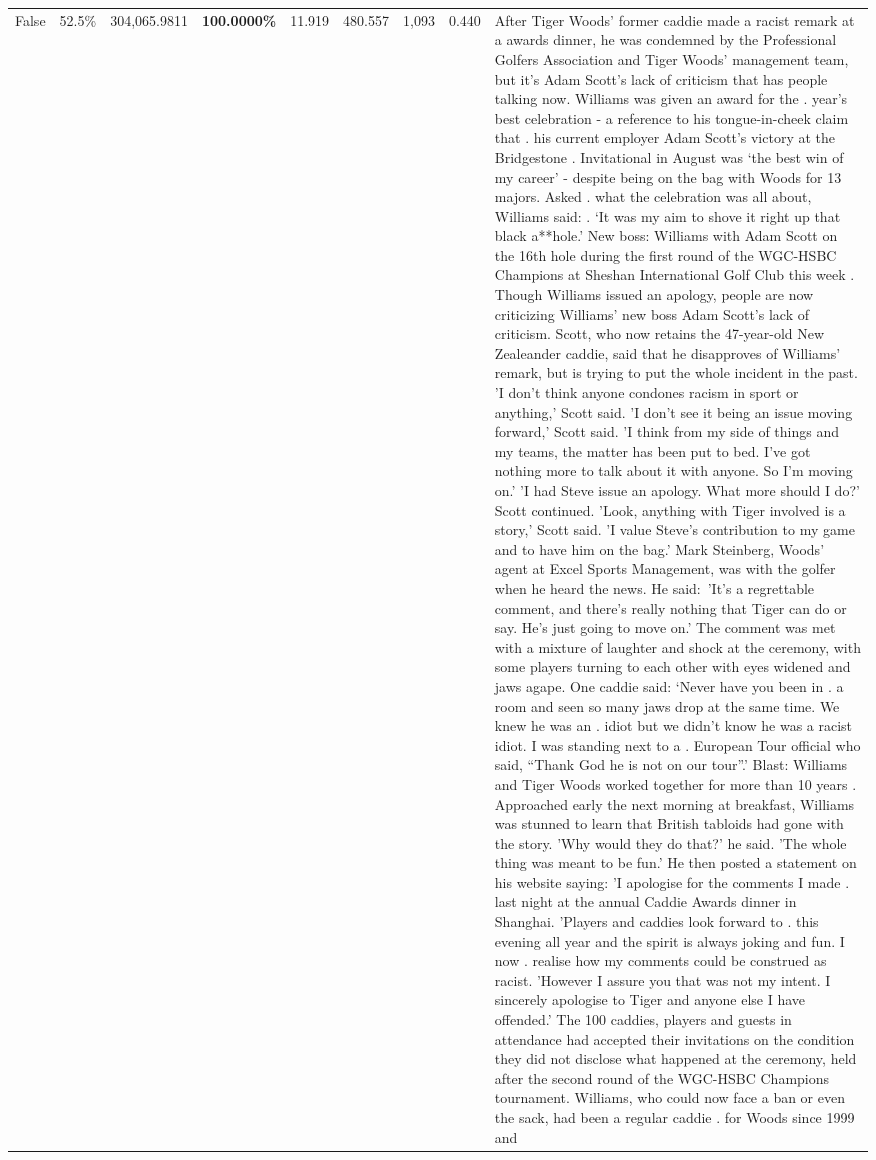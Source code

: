 \begin{table}[H]
\begin{tabular}{lllrlllll}
False & 52.5\% & 304,065.9811 & \bfseries \color{red} 100.0000\% & 11.919 & 480.557 & 1,093 & 0.440 & After Tiger Woods' former caddie made a racist remark at a awards dinner, he was condemned by the Professional Golfers Association and Tiger Woods' management team, but it's Adam Scott's lack of criticism that has people talking now. Williams was given an award for the . year’s best celebration - a reference to his tongue-in-cheek claim that . his current employer Adam Scott’s victory at the Bridgestone . Invitational in August was ‘the best win of my career’ - despite being on the bag with Woods for 13 majors. Asked . what the celebration was all about, Williams said: . ‘It was my aim to shove it right up that black a**hole.’ New boss: Williams with Adam Scott  on the 16th hole during the first round of the WGC-HSBC Champions at Sheshan International Golf Club this week . Though Williams issued an apology, people are now criticizing Williams' new boss Adam Scott's lack of criticism. Scott, who now retains the 47-year-old New Zealeander caddie, said that he disapproves of Williams' remark, but is trying to put the whole incident in the past. 'I don't think anyone condones racism in sport or anything,' Scott said. 'I don't see it being an issue moving forward,' Scott said. 'I think from my side of things and my teams, the matter has been put to bed. I've got nothing more to talk about it with anyone. So I'm moving on.' 'I had Steve issue an apology. What more should I do?' Scott continued. 'Look, anything with Tiger involved is a story,' Scott said. 'I value Steve's contribution to my game and to have him on the bag.' Mark Steinberg, Woods' agent at Excel Sports Management, was with the golfer when he heard the news. He said: 'It's a regrettable comment, and there's really nothing that Tiger can do or say. He's just going to move on.' The comment was met with a mixture of laughter and shock at the ceremony, with some players turning to each other with eyes widened and jaws agape. One caddie said: ‘Never have you been in . a room and seen so many jaws drop at the same time. We knew he was an . idiot but we didn’t know he was a racist idiot. I was standing next to a . European Tour official who said, “Thank God he is not on our tour”.’ Blast: Williams and Tiger Woods worked together for more than 10 years . Approached early the next morning at breakfast, Williams was stunned to learn that British tabloids had gone with the story. 'Why would they do that?' he said. 'The whole thing was meant to be fun.' He then posted a statement on his website saying: 'I apologise for the comments I made . last night at the annual Caddie Awards dinner in Shanghai. 'Players and caddies look forward to . this evening all year and the spirit is always joking and fun. I now . realise how my comments could be construed as racist. 'However I assure you that was not my intent. I sincerely apologise to Tiger and anyone else I have offended.' The 100 caddies, players and guests in attendance had accepted their invitations on the condition they did not disclose what happened at the ceremony, held after the second round of the WGC-HSBC Champions tournament. Williams, who could now face a ban or even the sack, had been a regular caddie . for Woods since 1999 and 
\end{tabular}
\end{table}
